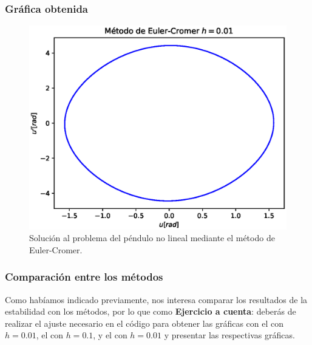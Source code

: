 \begin{frame}
\frametitle{Gráfica obtenida}
\begin{figure}[h!]
    \centering
    \includegraphics[scale=0.6]{Imagenes/metodo_EDO2_Euler_Cromer_01.eps}
    \caption{Solución al problema del péndulo no lineal mediante el método de Euler-Cromer.}
    \label{fig:figura_12_EDO2_01}
\end{figure}
\end{frame}
\begin{frame}
\frametitle{Comparación entre los métodos}
Como habíamos indicado previamente, nos interesa comparar los resultados de la estabilidad con los métodos, por lo que como \textbf{Ejercicio a cuenta}: deberás de realizar el ajuste necesario en el código para obtener las gráficas con el  con $h=0.01$, el  con $h=0.1$, y el  con $h=0.01$ y presentar las respectivas gráficas.
\end{frame}
